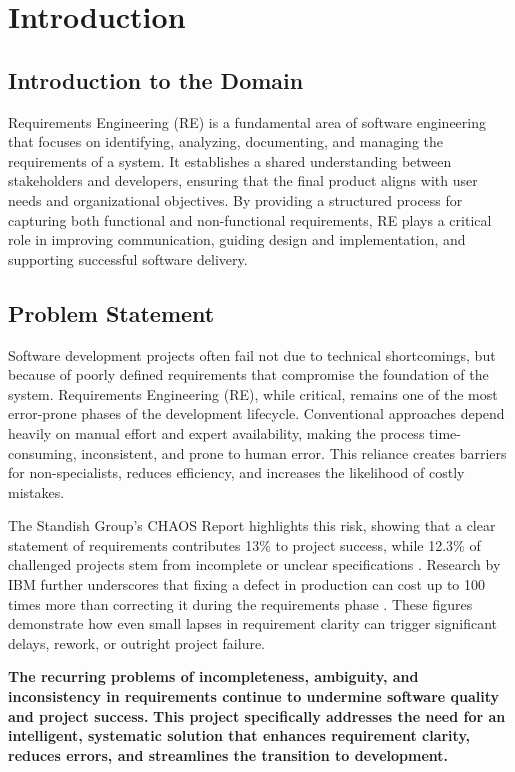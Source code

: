 \chapter{Introduction}
\label{sec:introduction}
\section{Introduction to the Domain}
Requirements Engineering (RE) is a fundamental area of software engineering that focuses on identifying, analyzing, documenting, and managing the requirements of a system. It establishes a shared understanding between stakeholders and developers, ensuring that the final product aligns with user needs and organizational objectives. By providing a structured process for capturing both functional and non-functional requirements, RE plays a critical role in improving communication, guiding design and implementation, and supporting successful software delivery.
\section{Problem Statement}
\vspace{-0.5cm} 
Software development projects often fail not due to technical shortcomings, but because of poorly defined requirements that compromise the foundation of the system. Requirements Engineering (RE), while critical, remains one of the most error-prone phases of the development lifecycle. Conventional approaches depend heavily on manual effort and expert availability, making the process time-consuming, inconsistent, and prone to human error. This reliance creates barriers for non-specialists, reduces efficiency, and increases the likelihood of costly mistakes.  

The Standish Group’s CHAOS Report highlights this risk, showing that a clear statement of requirements contributes 13\% to project success, while 12.3\% of challenged projects stem from incomplete or unclear specifications \cite{1}. Research by IBM further underscores that fixing a defect in production can cost up to 100 times more than correcting it during the requirements phase \cite{2}. These figures demonstrate how even small lapses in requirement clarity can trigger significant delays, rework, or outright project failure.  

\textbf{The recurring problems of incompleteness, ambiguity, and inconsistency in requirements continue to undermine software quality and project success.}  
\textbf{This project specifically addresses the need for an intelligent, systematic solution that enhances requirement clarity, reduces errors, and streamlines the transition to development.}
